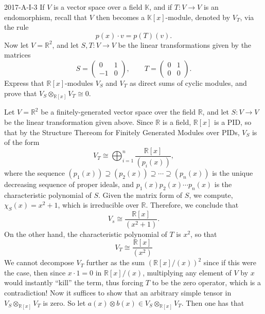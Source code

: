 \documentclass{article}
\begin{document}
	\begin{prb}{2017-A-I-3}
		If $V$ is a vector space over a field $\mathbb{K}$, and if $T: V \to V$ is an endomorphism, recall that $V$ then becomes a $\mathbb{K}[x]$-module, denoted by $V_{T}$, via the rule 
		\begin{equation*}
			p(x) \cdot v = p(T)(v). 
		\end{equation*}
		Now let $V = \mathbb{R}^{2}$, and let $S, T: V \to V$ be the linear transformations given by the matrices 
		\begin{equation*}
			S = 
			\begin{pmatrix}
				0 & 1 \\ -1 & 0
			\end{pmatrix}, 
			\qquad 
			T = 
			\begin{pmatrix}
				0 & 1 \\ 0 & 0 
			\end{pmatrix}. 
		\end{equation*}
		Express that $\mathbb{R}[x]$-modules $V_{S}$ and $V_{T}$ as direct sums of cyclic modules, and prove that $V_{S} \otimes_{\mathbb{R}[x]} V_{T} \cong 0$. 
	\end{prb}
	Let $V = \mathbb{R}^{2}$ be a finitely-generated vector space over the field $\mathbb{R}$, and let $S: V \to V$ be the linear transformation given above. Since $\mathbb{R}$ is a field, $\mathbb{R}[x]$ is a PID, so that by the Structure Thereom for Finitely Generated Modules over PIDs, $V_{S}$ is of the form 
	\begin{equation*}
		V_{T} \cong \bigoplus_{i = 1}^{n}\frac{\mathbb{R}[x]}{(p_{i}(x))}, 
	\end{equation*}
	where the sequence $(p_{1}(x)) \supseteq (p_{2}(x)) \supseteq \dotsm \supseteq (p_{n}(x))$ is the unique decreasing sequence of proper ideals, and $p_{1}(x)p_{2}(x)\dotsm p_{n}(x)$ is the characteristic polynomial of $S$. Given the matrix form of $S$, we compute, $\chi_{S}(x) = x^{2} + 1$, which is irreducible over $\mathbb{R}$. Therefore, we conclude that 
	\begin{equation*}
		V_{s} \cong \frac{\mathbb{R}[x]}{(x^{2} + 1)}. 
	\end{equation*}
	On the other hand, the characteristic polynomial of $T$ is $x^{2}$, so that 
	\begin{equation*}
		V_{T} \cong \frac{\mathbb{R}[x]}{(x^{2})}
	\end{equation*}
	We cannot decompose $V_{T}$ further as the sum $(\mathbb{R}[x]/(x))^{2}$ since if this were the case, then since $x \cdot 1= 0$ in $\mathbb{R}[x]/(x)$, multiplying any element of $V$ by $x$ would instantly ``kill'' the term, thus forcing $T$ to be the zero operator, which is a contradiction! Now it suffices to show that an arbitrary simple tensor in $V_{S} \otimes_{\mathbb{R}[x]} V_{T}$ is zero. So let $a(x) \otimes b(x) \in V_{S}\otimes_{\mathbb{R}[x]} V_{T}$. Then one has that 
\end{document}
